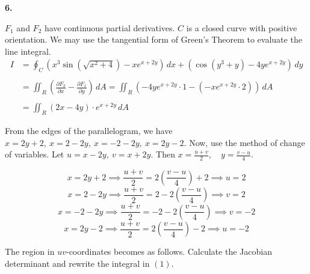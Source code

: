 \documentclass{article}
\begin{document}
\textbf{6.}
\begin{center}
\end{center}

\newpage

${F}_1$ and ${F}_2$ have continuous partial derivatives. $C$ is a closed curve with positive orientation. We may use the tangential form of Green's Theorem to evaluate the line integral.
\begin{align}{I}&=\oint_C\left(x^3\sin\left(\sqrt{x^2+4}\right)-x{e}^{x+2y}\right)\,dx + \left(\cos\left(y^3+y\right)-4y{e}^{x+2y}\right)\,dy\nonumber\\\nonumber\\&=\iint_R\left(\frac{\partial{F}_2}{\partial x}-\frac{\partial{F}_1}{\partial y}\right)\,dA=\iint_R\left(-4y{e}^{x+2y}\cdot1-\left(-x{e}^{x+2y}\cdot2\right)\right)\,dA\nonumber\\\nonumber\\&=\iint_R(2x-4y)\cdot{e}^{x+2y}\,dA\end{align}

From the edges of the parallelogram, we have $\displaystyle x=2y+2,\:x=2-2y,\:x=-2-2y,\:x=2y-2$. Now, use the method of change of variables. Let $\displaystyle u=x-2y,\:v=x+2y$. Then $\displaystyle x=\frac{u+v}2,\quad y=\frac{v-u}{4}$.

\[x=2y+2\implies \frac{u+v}2=2\left(\frac{v-u}4\right)+2\implies u=2\]
\[x=2-2y\implies \frac{u+v}2=2-2\left(\frac{v-u}4\right)\implies v=2\]
\[x=-2-2y\implies \frac{u+v}2=-2-2\left(\frac{v-u}4\right)\implies v=-2\]
\[x=2y-2\implies \frac{u+v}2=2\left(\frac{v-u}4\right)-2\implies u=-2\]

The region in $uv$-coordinates becomes as follows. Calculate the Jacobian determinant and rewrite the integral in $(1)$.
\end{document}
